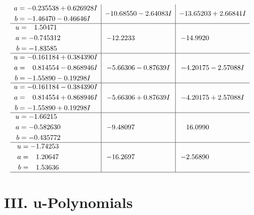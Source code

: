 \documentclass[1p]{elsarticle_modified}
\theoremstyle{definition}
\begin{document}
$$\begin{array}{c|c|c}
\begin{aligned}
a &= -0.235538 + 0.626928 I \\
b &= -1.46470 - 0.46646 I\end{aligned}
 & -10.68550 - 2.64083 I & -13.65203 + 2.66841 I \\ \hline\begin{aligned}
u &= \phantom{-}1.50471\phantom{ +0.000000I} \\
a &= -0.745312\phantom{ +0.000000I} \\
b &= -1.83585\phantom{ +0.000000I}\end{aligned}
 & -12.2233\phantom{ +0.000000I} & -14.9920\phantom{ +0.000000I} \\ \hline\begin{aligned}
u &= -0.161184 + 0.384390 I \\
a &= \phantom{-}0.814554 - 0.868946 I \\
b &= -1.55890 - 0.19298 I\end{aligned}
 & -5.66306 - 0.87639 I & -4.20175 - 2.57088 I \\ \hline\begin{aligned}
u &= -0.161184 - 0.384390 I \\
a &= \phantom{-}0.814554 + 0.868946 I \\
b &= -1.55890 + 0.19298 I\end{aligned}
 & -5.66306 + 0.87639 I & -4.20175 + 2.57088 I \\ \hline\begin{aligned}
u &= -1.66215\phantom{ +0.000000I} \\
a &= -0.582630\phantom{ +0.000000I} \\
b &= -0.435772\phantom{ +0.000000I}\end{aligned}
 & -9.48097\phantom{ +0.000000I} & \phantom{-}16.0990\phantom{ +0.000000I} \\ \hline\begin{aligned}
u &= -1.74253\phantom{ +0.000000I} \\
a &= \phantom{-}1.20647\phantom{ +0.000000I} \\
b &= \phantom{-}1.53636\phantom{ +0.000000I}\end{aligned}
 & -16.2697\phantom{ +0.000000I} & -2.56890\phantom{ +0.000000I}\\
 \hline 
 \end{array}$$\newpage
\newpage\renewcommand{\arraystretch}{1}
\centering \section*{ III. u-Polynomials}
\end{document}
